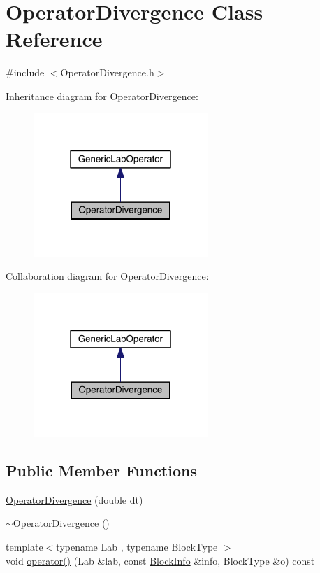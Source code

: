 \hypertarget{class_operator_divergence}{}\section{Operator\+Divergence Class Reference}
\label{class_operator_divergence}


{\ttfamily \#include $<$Operator\+Divergence.\+h$>$}



Inheritance diagram for Operator\+Divergence\+:\nopagebreak
\begin{figure}[H]
\begin{center}
\leavevmode
\includegraphics[width=187pt]{d4/d25/class_operator_divergence__inherit__graph}
\end{center}
\end{figure}


Collaboration diagram for Operator\+Divergence\+:\nopagebreak
\begin{figure}[H]
\begin{center}
\leavevmode
\includegraphics[width=187pt]{d1/d49/class_operator_divergence__coll__graph}
\end{center}
\end{figure}
\subsection*{Public Member Functions}
\begin{DoxyCompactItemize}
\item 
\hyperlink{class_operator_divergence_a92331667e69c3d2bd224e018aabd468e}{Operator\+Divergence} (double dt)
\item 
\hyperlink{class_operator_divergence_a52a4ddc9c34920a5bb89bfa11e22fba1}{$\sim$\+Operator\+Divergence} ()
\item 
{\footnotesize template$<$typename Lab , typename Block\+Type $>$ }\\void \hyperlink{class_operator_divergence_a84b0abc1e4b1dc921c144a08cb3059a7}{operator()} (Lab \&lab, const \hyperlink{struct_block_info}{Block\+Info} \&info, Block\+Type \&o) const 
\end{DoxyCompactItemize}
